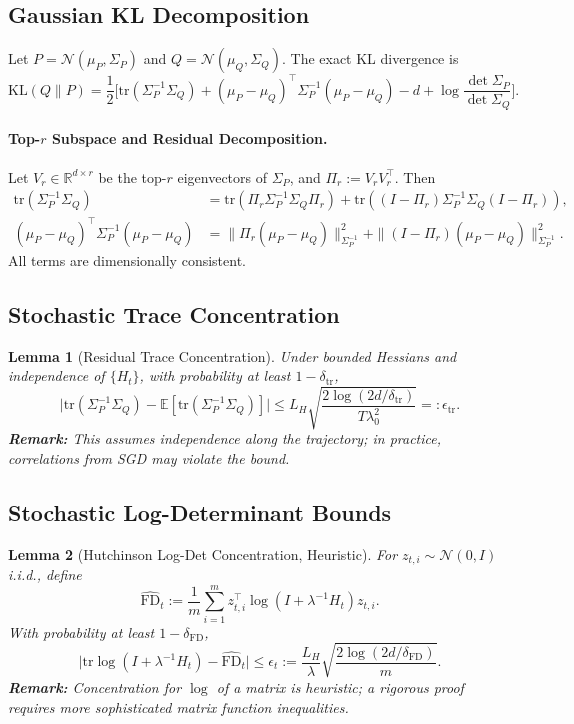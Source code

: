 \documentclass[11pt]{article}
\newtheorem{lemma}{Lemma}[section]
\begin{document}
\subsection{Gaussian KL Decomposition}
Let $P = \mathcal{N}(\mu_P, \Sigma_P)$ and $Q = \mathcal{N}(\mu_Q, \Sigma_Q)$.  
The exact KL divergence is
\begin{equation}
\mathrm{KL}(Q\|P) = \frac{1}{2} \Big[ \mathrm{tr}(\Sigma_P^{-1} \Sigma_Q) + (\mu_P - \mu_Q)^\top \Sigma_P^{-1} (\mu_P - \mu_Q) - d + \log\frac{\det \Sigma_P}{\det \Sigma_Q} \Big].
\label{eq:exact_gaussian_kl}
\end{equation}

\paragraph{Top-$r$ Subspace and Residual Decomposition.}
Let $V_r \in \mathbb{R}^{d \times r}$ be the top-$r$ eigenvectors of $\Sigma_P$, and $\Pi_r := V_r V_r^\top$. Then
\begin{align}
\mathrm{tr}(\Sigma_P^{-1}\Sigma_Q) &= \mathrm{tr}(\Pi_r \Sigma_P^{-1}\Sigma_Q \Pi_r) + \mathrm{tr}((I-\Pi_r)\Sigma_P^{-1}\Sigma_Q(I-\Pi_r)), \\
(\mu_P-\mu_Q)^\top \Sigma_P^{-1} (\mu_P-\mu_Q) &= \| \Pi_r (\mu_P-\mu_Q) \|_{\Sigma_P^{-1}}^2 + \| (I-\Pi_r)(\mu_P-\mu_Q)\|_{\Sigma_P^{-1}}^2.
\end{align}
All terms are dimensionally consistent.

\subsection{Stochastic Trace Concentration}
\begin{lemma}[Residual Trace Concentration]
Under bounded Hessians and independence of $\{H_t\}$, with probability at least $1-\delta_{\mathrm{tr}}$,
\[
\Big| \mathrm{tr}(\Sigma_P^{-1} \Sigma_Q) - \mathbb{E}[\mathrm{tr}(\Sigma_P^{-1} \Sigma_Q)] \Big| 
\le L_H \sqrt{\frac{2 \log(2d/\delta_{\mathrm{tr}})}{T \lambda_0^2}} =: \epsilon_{\mathrm{tr}}.
\]
\textbf{Remark:} This assumes independence along the trajectory; in practice, correlations from SGD may violate the bound.
\end{lemma}

\subsection{Stochastic Log-Determinant Bounds}
\begin{lemma}[Hutchinson Log-Det Concentration, Heuristic]
For $z_{t,i} \sim \mathcal{N}(0,I)$ i.i.d., define
\[
\widehat{\mathrm{FD}}_t := \frac{1}{m} \sum_{i=1}^m z_{t,i}^\top \log(I + \lambda^{-1} H_t) z_{t,i}.
\]
With probability at least $1-\delta_{\mathrm{FD}}$,
\[
\Big| \mathrm{tr} \log(I + \lambda^{-1} H_t) - \widehat{\mathrm{FD}}_t \Big| \le \epsilon_t := \frac{L_H}{\lambda} \sqrt{\frac{2 \log(2d/\delta_{\mathrm{FD}})}{m}}.
\]
\textbf{Remark:} Concentration for $\log$ of a matrix is heuristic; a rigorous proof requires more sophisticated matrix function inequalities.
\end{lemma}
\end{document}

